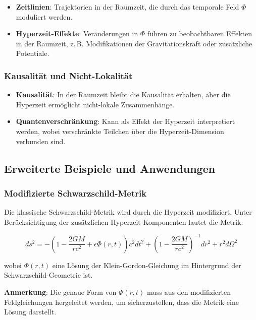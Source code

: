 \documentclass[11pt,a4paper]{article}
\begin{document}
\begin{itemize}
    \item \textbf{Zeitlinien}: Trajektorien in der Raumzeit, die durch das temporale Feld $\Phi$ moduliert werden.
    \item \textbf{Hyperzeit-Effekte}: Veränderungen in $\Phi$ führen zu beobachtbaren Effekten in der Raumzeit, z.\,B. Modifikationen der Gravitationskraft oder zusätzliche Potentiale.
\end{itemize}

\subsubsection{Kausalität und Nicht-Lokalität}

\begin{itemize}
    \item \textbf{Kausalität}: In der Raumzeit bleibt die Kausalität erhalten, aber die Hyperzeit ermöglicht nicht-lokale Zusammenhänge.
    \item \textbf{Quantenverschränkung}: Kann als Effekt der Hyperzeit interpretiert werden, wobei verschränkte Teilchen über die Hyperzeit-Dimension verbunden sind.
\end{itemize}

\subsection{Erweiterte Beispiele und Anwendungen}

\subsubsection{Modifizierte Schwarzschild-Metrik}

Die klassische Schwarzschild-Metrik wird durch die Hyperzeit modifiziert. Unter Berücksichtigung der zusätzlichen Hyperzeit-Komponenten lautet die Metrik:

\begin{equation}
ds^2 = -\left(1 - \frac{2GM}{rc^2} + \epsilon \Phi(r, t) \right)c^2 dt^2 + \left(1 - \frac{2GM}{rc^2}\right)^{-1} dr^2 + r^2 d\Omega^2
\end{equation}

wobei $\Phi(r, t)$ eine Lösung der Klein-Gordon-Gleichung im Hintergrund der Schwarzschild-Geometrie ist.

\textbf{Anmerkung}: Die genaue Form von $\Phi(r, t)$ muss aus den modifizierten Feldgleichungen hergeleitet werden, um sicherzustellen, dass die Metrik eine Lösung darstellt.
\end{document}
